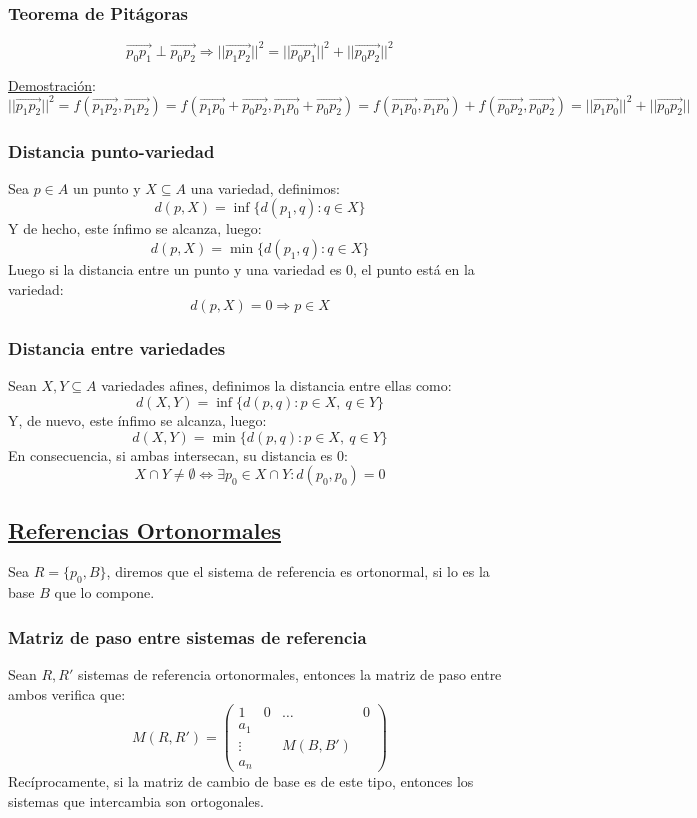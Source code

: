 \documentclass[10pt,a4paper,openright]{book}
\begin{document}
\subsubsection*{Teorema de Pitágoras}
$$\vec{p_0p_1}\perp \vec{p_0p_2}\Rightarrow ||\vec{p_1p_2}||^2 = ||\vec{p_0p_1}||^2 + ||\vec{p_0p_2}||^2$$

\underline{Demostración}:
$$||\vec{p_1p_2}|| ^2 = f(\vec{p_1p_2}, \vec{p_1p_2}) = f(\vec{p_1p_0}+\vec{p_0p_2}, \vec{p_1p_0}+\vec{p_0p_2}) = f (\vec{p_1p_0}, \vec{p_1p_0}) + f(\vec{p_0p_2}, \vec{p_0p_2}) = ||\vec{p_1p_0}||^2 + ||\vec{p_0p_2}||$$

\subsubsection*{Distancia punto-variedad}
Sea $p\in A$ un punto y $X\subseteq A$ una variedad, definimos:
$$d(p,X) = \inf\{d(p_1,q) : q\in X\}$$
Y de hecho, este ínfimo se alcanza, luego:
$$d(p,X) = \min\{d(p_1,q) : q\in X\}$$
Luego si la distancia entre un punto y una variedad es 0, el punto está en la variedad:
$$d(p,X) = 0 \Rightarrow p\in X$$

\subsubsection*{Distancia entre variedades}
Sean $X, Y\subseteq A$ variedades afines, definimos la distancia entre ellas como:
$$d(X,Y) = \inf\{d(p,q) : p\in X, \ q\in Y \}$$
Y, de nuevo, este ínfimo se alcanza, luego:
$$d(X,Y) = \min\{d(p,q) : p\in X, \ q\in Y \}$$
En consecuencia, si ambas intersecan, su distancia es 0:
$$X\cap Y \neq \emptyset \Leftrightarrow \exists p_0 \in X \cap Y: d(p_0,p_0) = 0$$

\subsection*{\underline{Referencias Ortonormales}}
Sea $R = \{p_0, B\}$, diremos que el sistema de referencia es ortonormal, si lo es la base $B$ que lo compone.

\subsubsection*{Matriz de paso entre sistemas de referencia}
Sean $R, R'$ sistemas de referencia ortonormales, entonces la matriz de paso entre ambos verifica que:
$$ M (R, R') = \left(\begin{array}{c|ccc}
1& 0 & \ldots & 0 \\
\hline
a_1 & & &   \\
\vdots & & M(B,B') & \\
a_n & & &
\end{array}
\right)$$
Recíprocamente, si la matriz de cambio de base es de este tipo, entonces los sistemas que intercambia son ortogonales.
\end{document}
